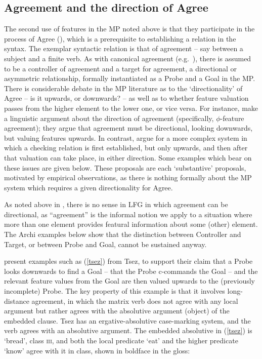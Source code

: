 \documentclass[output=paper,hidelinks]{langscibook}
\begin{document}
\subsection{Agreement and the direction of Agree}
\label{sec:minimalism:agreement}

The second use of features in the MP noted above is that they
participate in the process of Agree (\citealp{chomsky00}), which is a
prerequisite to establishing a relation in the syntax. The exemplar
syntactic relation is that of agreement -- say between a subject and a
finite verb. As with canonical agreement (e.g.~\citealp{corbett06}),
there is assumed to be a controller of agreement and a target for
agreement, a directional or asymmetric relationship, formally
instantiated as a Probe and a Goal in the MP. There is considerable
debate in the MP literature as to the `directionality' of Agree -- is
it upwards, or downwards? -- as well as to whether feature valuation
passes from the higher element to the lower one, or vice versa. For
instance, \citet{poliprem19} make a linguistic argument about the
direction of agreement (specifically, $\phi$-feature agreement); they
argue that agreement must be directional, looking downwards, but
valuing features upwards. In contrast, \citet{bjorzeij19} argue for a
more complex system in which a checking relation is first established,
but only upwards, and then after that valuation can take place, in
either direction. Some examples which bear on these issues are given
below. These proposals are each `substantive' proposals, motivated by
empirical observations, as there is nothing formally about the MP
system which requires a given directionality for Agree.

As noted above in , there is no sense in
LFG in which agreement can be directional, as ``agreement'' is the
informal notion we apply to a situation where more than one element
provides featural information about some (other) element. The Archi
examples below show that the distinction between Controller and
Target, or between Probe and Goal, cannot be sustained anyway.

\citet{poliprem19} present examples such as (\ref{tsez}) from Tsez, to
support their claim that a Probe looks downwards to find a Goal --
that the Probe c-commands the Goal -- and the relevant feature values
from the Goal are then valued upwards to the (previously incomplete)
Probe. The key property of this example is that it involves
long-distance agreement, in which the matrix verb does not agree with
any local argument but rather agrees with the absolutive argument
(object) of the embedded clause. Tsez has an ergative-absolutive
case-marking system, and the verb agrees with an absolutive
argument. The embedded absolutive in (\ref{tsez}) is `bread', class
\textsc{iii}, and both the local predicate `eat' and the higher
predicate `know' agree with it in class, shown in boldface in the
gloss:
\end{document}
